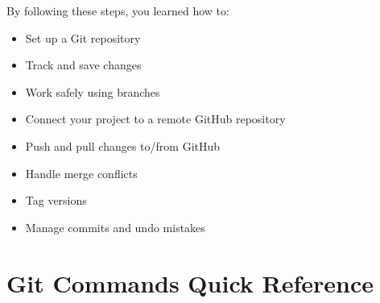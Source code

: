 \documentclass[
  11pt,
  a4paper,
]{article}
\begin{document}
By following these steps, you learned how to:

\begin{itemize}
\item
  Set up a Git repository
\item
  Track and save changes
\item
  Work safely using branches
\item
  Connect your project to a remote GitHub repository
\item
  Push and pull changes to/from GitHub
\item
  Handle merge conflicts
\item
  Tag versions
\item
  Manage commits and undo mistakes \newpage
\end{itemize}

\section{Git Commands Quick
Reference}\label{git-commands-quick-reference}
\end{document}
